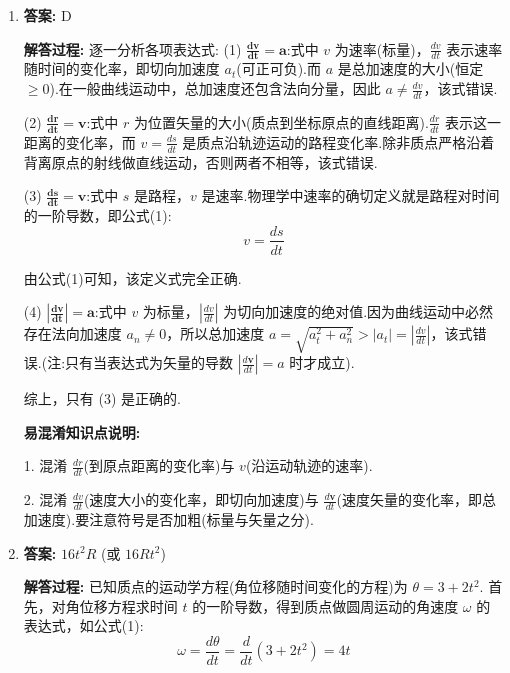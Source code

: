 \begin{enumerate}
\textbf{易混淆知识点说明:}
加速度是矢量，在求总加速度大小时不能直接将各个方向加速度的大小进行代数相加(即不能选C).必须按照矢量运算规则求合成矢量的大小.

\vspace{2em}

\item[\textbf{1-7}]


\textbf{答案:} D

\textbf{解答过程:}
逐一分析各项表达式:
(1) $\mathbf{\frac{dv}{dt} = a}$:式中 $v$ 为速率(标量)，$\frac{dv}{dt}$ 表示速率随时间的变化率，即切向加速度 $a_t$(可正可负).而 $a$ 是总加速度的大小(恒定 $\ge 0$).在一般曲线运动中，总加速度还包含法向分量，因此 $a \neq \frac{dv}{dt}$，该式错误.

(2) $\mathbf{\frac{dr}{dt} = v}$:式中 $r$ 为位置矢量的大小(质点到坐标原点的直线距离).$\frac{dr}{dt}$ 表示这一距离的变化率，而 $v = \frac{ds}{dt}$ 是质点沿轨迹运动的路程变化率.除非质点严格沿着背离原点的射线做直线运动，否则两者不相等，该式错误.

(3) $\mathbf{\frac{ds}{dt} = v}$:式中 $s$ 是路程，$v$ 是速率.物理学中速率的确切定义就是路程对时间的一阶导数，即公式(1):
\begin{equation}
	v = \frac{ds}{dt}
\end{equation}

由公式(1)可知，该定义式完全正确.

(4) $\mathbf{\left| \frac{dv}{dt} \right| = a}$:式中 $v$ 为标量，$\left| \frac{dv}{dt} \right|$ 为切向加速度的绝对值.因为曲线运动中必然存在法向加速度 $a_n \neq 0$，所以总加速度 $a = \sqrt{a_t^2 + a_n^2} > |a_t| = \left| \frac{dv}{dt} \right|$，该式错误.(注:只有当表达式为矢量的导数 $\left| \frac{d\mathbf{v}}{dt} \right| = a$ 时才成立).

综上，只有 (3) 是正确的.

\textbf{易混淆知识点说明:}

1. 混淆 $\frac{dr}{dt}$(到原点距离的变化率)与 $v$(沿运动轨迹的速率).

2. 混淆 $\frac{dv}{dt}$(速度大小的变化率，即切向加速度)与 $\frac{d\mathbf{v}}{dt}$(速度矢量的变化率，即总加速度).要注意符号是否加粗(标量与矢量之分).

\vspace{2em}

\item[\textbf{1-12}]


\textbf{答案:} $16t^2 R$ (或 $16Rt^2$)

\textbf{解答过程:}
已知质点的运动学方程(角位移随时间变化的方程)为 $\theta = 3 + 2t^2$.
首先，对角位移方程求时间 $t$ 的一阶导数，得到质点做圆周运动的角速度 $\omega$ 的表达式，如公式(1):
\begin{equation}
	\omega = \frac{d\theta}{dt} = \frac{d}{dt}(3 + 2t^2) = 4t
\end{equation}


\end{enumerate}
